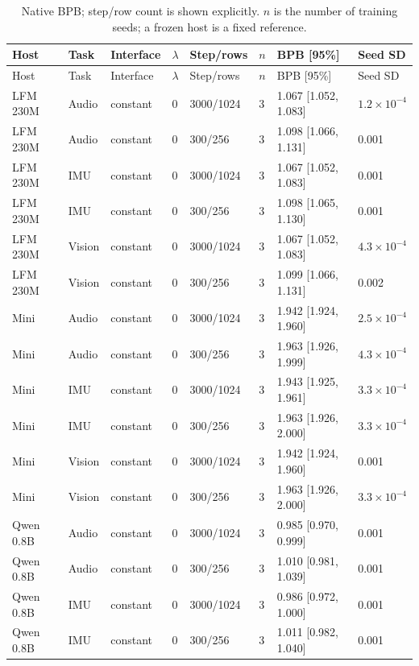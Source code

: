 {\small
\setlength{\tabcolsep}{4pt}
\begin{longtable}{@{}llllllll@{}}
\caption{Native BPB; step/row count is shown explicitly. $n$ is the number of training seeds; a frozen host is a fixed reference.}\label{tab:full-native_bpb}\\
\toprule
Host & Task & Interface & $\lambda$ & Step/rows & $n$ & BPB [95\%] & Seed SD \\
\midrule\endfirsthead
\toprule
Host & Task & Interface & $\lambda$ & Step/rows & $n$ & BPB [95\%] & Seed SD \\
\midrule\endhead
LFM 230M & Audio & constant & 0 & 3000/1024 & 3 & 1.067 [1.052, 1.083] & $1.2\times10^{-4}$ \\
LFM 230M & Audio & constant & 0 & 300/256 & 3 & 1.098 [1.066, 1.131] & 0.001 \\
LFM 230M & IMU & constant & 0 & 3000/1024 & 3 & 1.067 [1.052, 1.083] & 0.001 \\
LFM 230M & IMU & constant & 0 & 300/256 & 3 & 1.098 [1.065, 1.130] & 0.001 \\
LFM 230M & Vision & constant & 0 & 3000/1024 & 3 & 1.067 [1.052, 1.083] & $4.3\times10^{-4}$ \\
LFM 230M & Vision & constant & 0 & 300/256 & 3 & 1.099 [1.066, 1.131] & 0.002 \\
Mini & Audio & constant & 0 & 3000/1024 & 3 & 1.942 [1.924, 1.960] & $2.5\times10^{-4}$ \\
Mini & Audio & constant & 0 & 300/256 & 3 & 1.963 [1.926, 1.999] & $4.3\times10^{-4}$ \\
Mini & IMU & constant & 0 & 3000/1024 & 3 & 1.943 [1.925, 1.961] & $3.3\times10^{-4}$ \\
Mini & IMU & constant & 0 & 300/256 & 3 & 1.963 [1.926, 2.000] & $3.3\times10^{-4}$ \\
Mini & Vision & constant & 0 & 3000/1024 & 3 & 1.942 [1.924, 1.960] & 0.001 \\
Mini & Vision & constant & 0 & 300/256 & 3 & 1.963 [1.926, 2.000] & $3.3\times10^{-4}$ \\
Qwen 0.8B & Audio & constant & 0 & 3000/1024 & 3 & 0.985 [0.970, 0.999] & 0.001 \\
Qwen 0.8B & Audio & constant & 0 & 300/256 & 3 & 1.010 [0.981, 1.039] & 0.001 \\
Qwen 0.8B & IMU & constant & 0 & 3000/1024 & 3 & 0.986 [0.972, 1.000] & 0.001 \\
Qwen 0.8B & IMU & constant & 0 & 300/256 & 3 & 1.011 [0.982, 1.040] & 0.001 \\

\end{longtable}}
